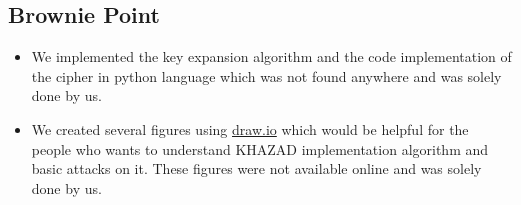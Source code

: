 \documentclass[preprint]{transcrypto}
\begin{document}
\subsection{Brownie Point}
\begin{itemize}
    \item We implemented the key expansion algorithm and the code implementation of the cipher in python language which was not found anywhere and was solely done by us.
    \item We created several figures using \url{draw.io} which would be helpful for the people who wants to understand KHAZAD implementation algorithm and basic attacks on it. These figures were not available online and was solely done by us.
\end{itemize} 




\end{document}

